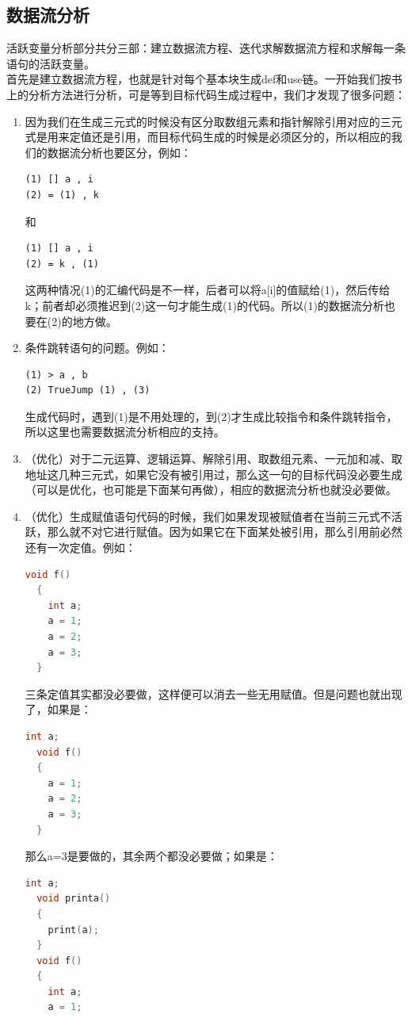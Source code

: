 \documentclass[12pt,a4paper,Flow]{report}
\begin{document}
\subsection{数据流分析}
活跃变量分析部分共分三部：建立数据流方程、迭代求解数据流方程和求解每一条语句的活跃变量。\\
\indent 首先是建立数据流方程，也就是针对每个基本块生成def和use链。一开始我们按书上的分析方法进行分析，可是等到目标代码生成过程中，我们才发现了很多问题：
\begin{enumerate}
\item 因为我们在生成三元式的时候没有区分取数组元素和指针解除引用对应的三元式是用来定值还是引用，而目标代码生成的时候是必须区分的，所以相应的我们的数据流分析也要区分，例如：
\begin{verbatim}
(1) [] a , i
(2) = (1) , k
\end{verbatim}
和
\begin{verbatim}
(1) [] a , i
(2) = k , (1)
\end{verbatim}
这两种情况(1)的汇编代码是不一样，后者可以将a[i]的值赋给(1)，然后传给k；前者却必须推迟到(2)这一句才能生成(1)的代码。所以(1)的数据流分析也要在(2)的地方做。
\item 条件跳转语句的问题。例如：
\begin{verbatim}
(1) > a , b
(2) TrueJump (1) , (3)
\end{verbatim}
生成代码时，遇到(1)是不用处理的，到(2)才生成比较指令和条件跳转指令，所以这里也需要数据流分析相应的支持。
\item （优化）对于二元运算、逻辑运算、解除引用、取数组元素、一元加和减、取地址这几种三元式，如果它没有被引用过，那么这一句的目标代码没必要生成（可以是优化，也可能是下面某句再做），相应的数据流分析也就没必要做。
\item （优化）生成赋值语句代码的时候，我们如果发现被赋值者在当前三元式不活跃，那么就不对它进行赋值。因为如果它在下面某处被引用，那么引用前必然还有一次定值。例如：
\begin{lstlisting}[language=c]
  void f()
  {
	int a;
    a = 1;
    a = 2;
    a = 3;
  }
\end{lstlisting}
三条定值其实都没必要做，这样便可以消去一些无用赋值。但是问题也就出现了，如果是：
\begin{lstlisting}[language=c]
  int a;
  void f()
  {
    a = 1;
    a = 2;
    a = 3;
  }
\end{lstlisting}
那么a=3是要做的，其余两个都没必要做；如果是：
\begin{lstlisting}[language=c]
  int a;
  void printa()
  {
    print(a);
  }
  void f()
  {
	int a;
    a = 1;

\end{lstlisting}
\end{enumerate}
\end{document}
